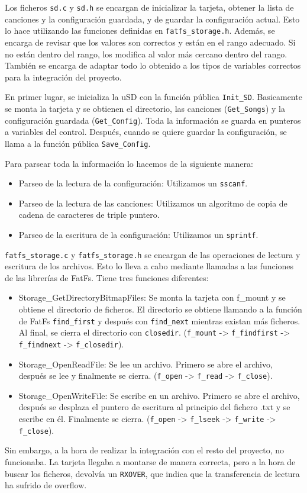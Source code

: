 Los ficheros \texttt{sd.c} y \texttt{sd.h} se encargan de inicializar la tarjeta, obtener la lista de canciones y la configuración guardada, y de guardar la configuración actual. Esto lo hace utilizando las funciones definidas en \texttt{fatfs_storage.h}. Además, se encarga de revisar que los valores son correctos y están en el rango adecuado. Si no están dentro del rango, los modifica al valor más cercano dentro del rango. También se encarga de adaptar todo lo obtenido a los tipos de variables correctos para la integración del proyecto.

En primer lugar, se inicializa la uSD con la función pública \texttt{Init_SD}. Basicamente se monta la tarjeta y se obtienen el directorio, las canciones (\texttt{Get_Songs}) y la configuración guardada (\texttt{Get_Config}). Toda la información se guarda en punteros a variables del control. Después, cuando se quiere guardar la configuración, se llama a la función pública \texttt{Save_Config}.

Para parsear toda la información lo hacemos de la siguiente manera:

\begin{itemize}
	\item Parseo de la lectura de la configuración: Utilizamos un \texttt{sscanf}.
	\item Parseo de la lectura de las canciones: Utilizamos un algoritmo de copia de cadena de caracteres de triple puntero.
	\item Parseo de la escritura de la configuración: Utilizamos un \texttt{sprintf}.
\end{itemize}

\texttt{fatfs_storage.c} y \texttt{fatfs_storage.h} se encargan de las operaciones de lectura y escritura de los archivos. Esto lo lleva a cabo mediante llamadas a las funciones de las librerías de FatFs. Tiene tres funciones diferentes:

\begin{itemize}
    \item Storage_GetDirectoryBitmapFiles: Se monta la tarjeta con f_mount y se obtiene el directorio de ficheros. El directorio se obtiene llamando a la función de FatFs \texttt{find_first} y después con \texttt{find_next} mientras existan más ficheros. Al final, se cierra el directorio con \texttt{closedir}. (\texttt{f_mount} -> \texttt{f_findfirst} -> \texttt{f_findnext} -> \texttt{f_closedir}).
    \item Storage_OpenReadFile: Se lee un archivo. Primero se abre el archivo, después se lee y finalmente se cierra. (\texttt{f_open} -> \texttt{f_read} -> \texttt{f_close}).
    \item Storage_OpenWriteFile: Se escribe en un archivo. Primero se abre el archivo, después se desplaza el puntero de escritura al principio del fichero .txt y se escribe en él. Finalmente se cierra. (\texttt{f_open} -> \texttt{f_lseek} -> \texttt{f_write} -> \texttt{f_close}).
\end{itemize}

Sin embargo, a la hora de realizar la integración con el resto del proyecto, no funcionaba. La tarjeta llegaba a montarse de manera correcta, pero a la hora de buscar los ficheros, devolvía un \texttt{RXOVER}, que indica que la transferencia de lectura ha sufrido de overflow. 


